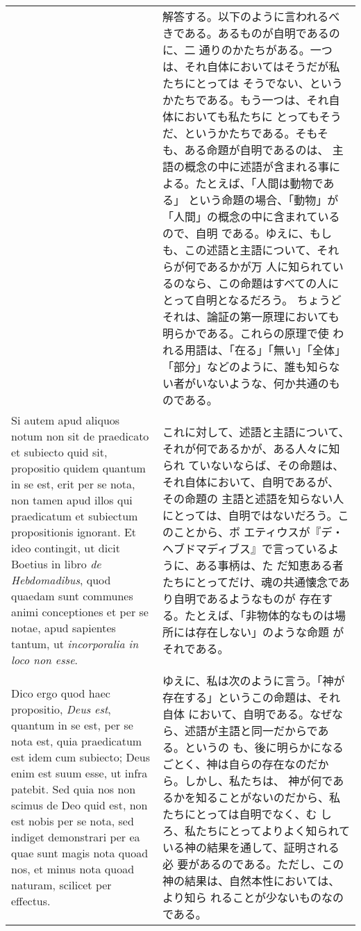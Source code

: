 \documentclass[10pt]{jsarticle}
\begin{document}
\begin{longtable}{p{21em}p{21em}}
&

解答する。以下のように言われるべきである。あるものが自明であるのに、二
通りのかたちがある。一つは、それ自体においてはそうだが私たちにとっては
そうでない、というかたちである。もう一つは、それ自体においても私たちに
とってもそうだ、というかたちである。そもそも、ある命題が自明であるのは、
主語の概念の中に述語が含まれる事による。たとえば、「人間は動物である」
という命題の場合、「動物」が「人間」の概念の中に含まれているので、自明
である。ゆえに、もしも、この述語と主語について、それらが何であるかが万
人に知られているのなら、この命題はすべての人にとって自明となるだろう。
ちょうどそれは、論証の第一原理においても明らかである。これらの原理で使
われる用語は、「在る」「無い」「全体」「部分」などのように、誰も知らな
い者がいないような、何か共通のものである。

\\

Si autem apud aliquos notum non sit de praedicato et subiecto quid
sit, propositio quidem quantum in se est, erit per se nota, non tamen
apud illos qui praedicatum et subiectum propositionis ignorant. Et
ideo contingit, ut dicit Boetius in libro {\it de Hebdomadibus}, quod
quaedam sunt communes animi conceptiones et per se notae, apud
sapientes tantum, ut {\it incorporalia in loco non esse}.


&

これに対して、述語と主語について、それが何であるかが、ある人々に知られ
ていないならば、その命題は、それ自体において、自明であるが、その命題の
主語と述語を知らない人にとっては、自明ではないだろう。このことから、ボ
エティウスが『デ・ヘブドマディブス』で言っているように、ある事柄は、た
だ知恵ある者たちにとってだけ、魂の共通懐念であり自明であるようなものが
存在する。たとえば、「非物体的なものは場所には存在しない」のような命題
がそれである。

\\


Dico ergo quod haec propositio, {\it Deus est}, quantum in se est, per
se nota est, quia praedicatum est idem cum subiecto; Deus enim est
suum esse, ut infra patebit. Sed quia nos non scimus de Deo quid est,
non est nobis per se nota, sed indiget demonstrari per ea quae sunt
magis nota quoad nos, et minus nota quoad naturam, scilicet per
effectus.


&

ゆえに、私は次のように言う。「神が存在する」というこの命題は、それ自体
において、自明である。なぜなら、述語が主語と同一だからである。というの
も、後に明らかになるごとく、神は自らの存在なのだから。しかし、私たちは、
神が何であるかを知ることがないのだから、私たちにとっては自明でなく、む
しろ、私たちにとってよりよく知られている神の結果を通して、証明される必
要があるのである。ただし、この神の結果は、自然本性においては、より知ら
れることが少ないものなのである。



\end{longtable}
\end{document}
